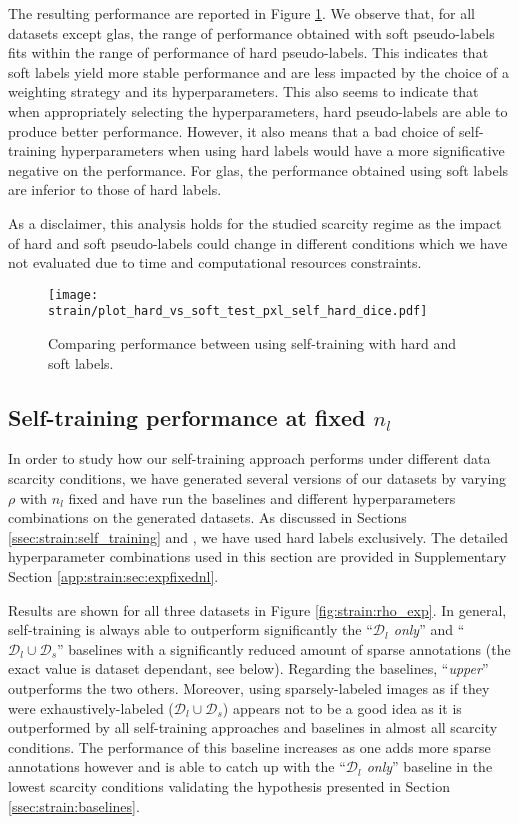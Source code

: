 The resulting performance are reported in Figure \ref{fig:strain:hard_vs_soft}. We observe that, for all datasets except \acrshort{glas}, the range of performance obtained with soft pseudo-labels fits within the range of performance of hard pseudo-labels. This indicates that soft labels yield more stable performance and are less impacted by the choice of a weighting strategy and its hyperparameters. This also seems to indicate that when appropriately selecting the hyperparameters, hard pseudo-labels are able to produce better performance. However, it also means that a bad choice of self-training hyperparameters when using hard labels would have a more significative negative on the performance. For \acrshort{glas}, the performance obtained using soft labels are inferior to those of hard labels. 

As a disclaimer, this analysis holds for the studied scarcity regime as the impact of hard and soft pseudo-labels could change in different conditions which we have not evaluated due to time and computational resources constraints. 

\begin{figure}
  \centering
  \texttt{[image: strain/plot\_hard\_vs\_soft\_test\_pxl\_self\_hard\_dice.pdf]}
  \caption{Comparing performance between using self-training with hard and soft labels.}
  \label{fig:strain:hard_vs_soft}
\end{figure}

\subsection{Self-training performance at fixed $n_l$}
\label{ssec:strain:fixednl}

In order to study how our self-training approach performs under different data scarcity conditions, we have generated several versions of our datasets by varying $\rho$ with $n_l$ fixed and have run the baselines and different hyperparameters combinations on the generated datasets. As discussed in Sections \ref{ssec:strain:self_training} and , we have used hard labels exclusively. The detailed hyperparameter combinations used in this section are provided in Supplementary Section \ref{app:strain:sec:expfixednl}.

Results are shown for all three datasets in Figure \ref{fig:strain:rho_exp}. In general, self-training is always able to outperform significantly the ``\textit{$\mathcal{D}_l$ only}'' and ``$\mathcal{D}_l \cup \mathcal{D}_s$'' baselines with a significantly reduced amount of sparse annotations (the exact value is dataset dependant, see below). Regarding the baselines, ``\textit{upper}''  outperforms the two others. Moreover, using sparsely-labeled images as if they were exhaustively-labeled (\ie $\mathcal{D}_l \cup \mathcal{D}_s$) appears not to be a good idea as it is outperformed by all self-training approaches and baselines in almost all scarcity conditions. The performance of this baseline increases as one adds more sparse annotations however and is able to catch up with the ``\textit{$\mathcal{D}_l$ only}'' baseline in the lowest scarcity conditions validating the hypothesis presented in Section \ref{ssec:strain:baselines}. 

